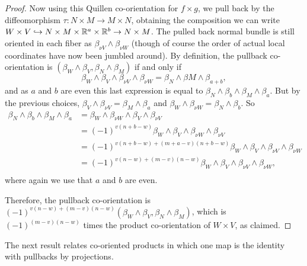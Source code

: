 \begin{proof}
	Now using this Quillen co-orientation for $f\times g$, we pull back by the diffeomorphism $\tau:N\times M\to M\times N$, obtaining the composition we can write $W\times V\hookrightarrow N\times M\times \mathbb{R}^a\times \mathbb{R}^b\to N\times M$.
	The pulled back normal bundle is still oriented in each fiber as $\beta_{\nu V}\wedge \beta_{\nu W}$ (though of course the order of actual local coordinates have now been jumbled around).
	By definition, the pullback co-orientation is $(\beta_W\wedge \beta_V,\beta_N\wedge \beta_M)$ if and only if $$\beta_W\wedge \beta_V\wedge \beta_{\nu V}\wedge \beta_{\nu W}=\beta_N\wedge \beta M\wedge \beta_{a+b},$$
	and as $a$ and $b$ are even this last expression is equal to
	$\beta_N\wedge \beta_b\wedge \beta_M\wedge \beta_{a}.$ But by the previous choices, $\beta_V\wedge \beta_{\nu V}=\beta_M\wedge \beta_a$ and $\beta_W\wedge \beta_{\nu W}=\beta_N\wedge \beta_b$.
	So
	\begin{align*}
		\beta_N\wedge \beta_b\wedge \beta_M\wedge \beta_{a}&=\beta_W\wedge \beta_{\nu W}\wedge \beta_V\wedge \beta_{\nu V}\\
		&=(-1)^{v(n+b-w)}\beta_W\wedge \beta_V\wedge \beta_{\nu W}\wedge \beta_{\nu V}\\
		&=(-1)^{v(n+b-w)+(m+a-v)(n+b-w)}\beta_W\wedge \beta_V\wedge \beta_{\nu V}\wedge \beta_{\nu W}\\
		&=(-1)^{v(n-w)+(m-v)(n-w)}\beta_W\wedge \beta_V\wedge \beta_{\nu V}\wedge \beta_{\nu W},\\
	\end{align*}
	where again we use that $a$ and $b$ are even.

	Therefore, the pullback co-orientation is $(-1)^{v(n-w)+(m-v)(n-w)}(\beta_W\wedge \beta_V,\beta_N \wedge \beta_M)$, which is $(-1)^{(m-v)(n-w)}$ times the product co-orientation of $W\times V$, as claimed.
\end{proof}

The next result relates co-oriented products in which one map is the identity with pullbacks by projections.

